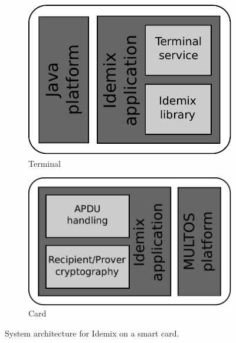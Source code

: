 \begin{figure}[t]
  \centering
  \begin{subfigure}{0.45\textwidth}
    \includegraphics[scale=.45]{images/idemix-terminal-architecture}
    \caption{Terminal}
    \label{fig:terminal-architecture}
  \end{subfigure}
  \qquad
  \begin{subfigure}{0.45\textwidth}
    \includegraphics[scale=.45]{images/idemix-card-architecture}
    \caption{Card}
    \label{fig:card-architecture}
  \end{subfigure}
  \caption{System architecture for Idemix on a smart card.}
  \label{fig:architecture}
\end{figure}

